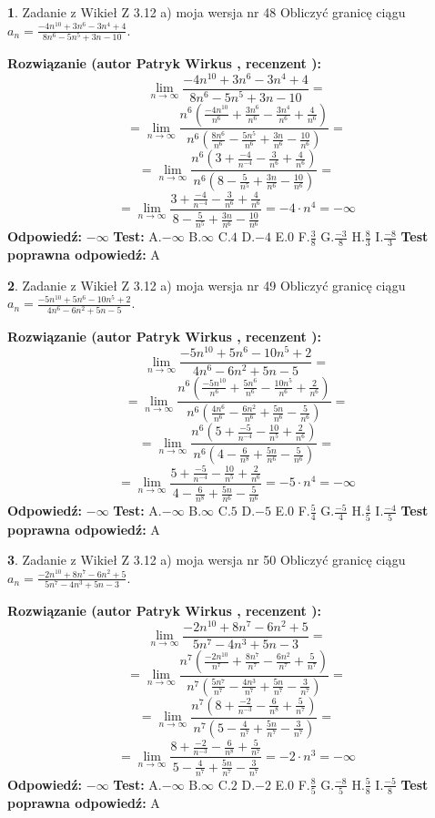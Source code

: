 \documentclass[12pt, a4paper]{article}
\theoremstyle{definition} %
\newtheorem{zad}{}
\newcommand{\zadStart}[1]{\begin{zad}#1\newline}
\newcommand{\zadStop}{\end{zad}}
\newcommand{\rozwStart}[2]{\noindent \textbf{Rozwiązanie (autor #1 , recenzent #2): }\newline}
\newcommand{\rozwStop}{\newline}
\newcommand{\odpStart}{\noindent \textbf{Odpowiedź:}\newline}
\newcommand{\odpStop}{\newline}
\newcommand{\testStart}{\noindent \textbf{Test:}\newline}
\newcommand{\testStop}{\newline}
\newcommand{\kluczStart}{\noindent \textbf{Test poprawna odpowiedź:}\newline}
\newcommand{\kluczStop}{\newline}
\begin{document}
\zadStart{Zadanie z Wikieł Z 3.12 a) moja wersja nr 48}
Obliczyć granicę ciągu $a_{n}=\frac{-4n^{10}+3n^{6}-3n^{4}+4}{8n^{6}-5n^{5}+3n-10}$.
\zadStop
\rozwStart{Patryk Wirkus}{}
$$\lim\limits_{n\to\infty}\frac{-4n^{10}+3n^{6}-3n^{4}+4}{8n^{6}-5n^{5}+3n-10}=$$
$$=\lim\limits_{n\to\infty}\frac{n^{6}\left(\frac{-4n^{10}}{n^{6}}+\frac{3n^{6}}{n^{6}}-\frac{3n^{4}}{n^{6}}+\frac{4}{n^{6}}\right)}{n^{6}\left(\frac{8n^{6}}{n^{6}}-\frac{5n^{5}}{n^{6}}+\frac{3n}{n^{6}}-\frac{10}{n^{6}}\right)}=$$
$$=\lim\limits_{n\to\infty}\frac{n^{6}\left(3+\frac{-4}{n^{-4}}-\frac{3}{n^{6}}+\frac{4}{n^{6}}\right)}
{n^{6}\left(8-\frac{5}{n^{5}}+\frac{3n}{n^{6}}-\frac{10}{n^{6}}\right)}=$$
$$=\lim\limits_{n\to\infty}\frac{3+\frac{-4}{n^{-4}}-\frac{3}{n^{6}}+\frac{4}{n^{6}}}{8-\frac{5}{n^{5}}+\frac{3n}{n^{6}}-\frac{10}{n^{6}}}=-4\cdot n^{4} = -\infty$$
\rozwStop
\odpStart
$-\infty$
\odpStop
\testStart
A.$-\infty$
B.$\infty$
C.$4$
D.$-4$
E.$0$
F.$\frac{3}{8}$
G.$\frac{-3}{8}$
H.$\frac{8}{3}$
I.$\frac{-8}{3}$
\testStop
\kluczStart
A
\kluczStop



\zadStart{Zadanie z Wikieł Z 3.12 a) moja wersja nr 49}
Obliczyć granicę ciągu $a_{n}=\frac{-5n^{10}+5n^{6}-10n^{5}+2}{4n^{6}-6n^{2}+5n-5}$.
\zadStop
\rozwStart{Patryk Wirkus}{}
$$\lim\limits_{n\to\infty}\frac{-5n^{10}+5n^{6}-10n^{5}+2}{4n^{6}-6n^{2}+5n-5}=$$
$$=\lim\limits_{n\to\infty}\frac{n^{6}\left(\frac{-5n^{10}}{n^{6}}+\frac{5n^{6}}{n^{6}}-\frac{10n^{5}}{n^{6}}+\frac{2}{n^{6}}\right)}{n^{6}\left(\frac{4n^{6}}{n^{6}}-\frac{6n^{2}}{n^{6}}+\frac{5n}{n^{6}}-\frac{5}{n^{6}}\right)}=$$
$$=\lim\limits_{n\to\infty}\frac{n^{6}\left(5+\frac{-5}{n^{-4}}-\frac{10}{n^{5}}+\frac{2}{n^{6}}\right)}
{n^{6}\left(4-\frac{6}{n^{8}}+\frac{5n}{n^{6}}-\frac{5}{n^{6}}\right)}=$$
$$=\lim\limits_{n\to\infty}\frac{5+\frac{-5}{n^{-4}}-\frac{10}{n^{5}}+\frac{2}{n^{6}}}{4-\frac{6}{n^{8}}+\frac{5n}{n^{6}}-\frac{5}{n^{6}}}=-5\cdot n^{4} = -\infty$$
\rozwStop
\odpStart
$-\infty$
\odpStop
\testStart
A.$-\infty$
B.$\infty$
C.$5$
D.$-5$
E.$0$
F.$\frac{5}{4}$
G.$\frac{-5}{4}$
H.$\frac{4}{5}$
I.$\frac{-4}{5}$
\testStop
\kluczStart
A
\kluczStop



\zadStart{Zadanie z Wikieł Z 3.12 a) moja wersja nr 50}
Obliczyć granicę ciągu $a_{n}=\frac{-2n^{10}+8n^{7}-6n^{2}+5}{5n^{7}-4n^{3}+5n-3}$.
\zadStop
\rozwStart{Patryk Wirkus}{}
$$\lim\limits_{n\to\infty}\frac{-2n^{10}+8n^{7}-6n^{2}+5}{5n^{7}-4n^{3}+5n-3}=$$
$$=\lim\limits_{n\to\infty}\frac{n^{7}\left(\frac{-2n^{10}}{n^{7}}+\frac{8n^{7}}{n^{7}}-\frac{6n^{2}}{n^{7}}+\frac{5}{n^{7}}\right)}{n^{7}\left(\frac{5n^{7}}{n^{7}}-\frac{4n^{3}}{n^{7}}+\frac{5n}{n^{7}}-\frac{3}{n^{7}}\right)}=$$
$$=\lim\limits_{n\to\infty}\frac{n^{7}\left(8+\frac{-2}{n^{-3}}-\frac{6}{n^{8}}+\frac{5}{n^{7}}\right)}
{n^{7}\left(5-\frac{4}{n^{7}}+\frac{5n}{n^{7}}-\frac{3}{n^{7}}\right)}=$$
$$=\lim\limits_{n\to\infty}\frac{8+\frac{-2}{n^{-3}}-\frac{6}{n^{8}}+\frac{5}{n^{7}}}{5-\frac{4}{n^{7}}+\frac{5n}{n^{7}}-\frac{3}{n^{7}}}=-2\cdot n^{3} = -\infty$$
\rozwStop
\odpStart
$-\infty$
\odpStop
\testStart
A.$-\infty$
B.$\infty$
C.$2$
D.$-2$
E.$0$
F.$\frac{8}{5}$
G.$\frac{-8}{5}$
H.$\frac{5}{8}$
I.$\frac{-5}{8}$
\testStop
\kluczStart
A
\kluczStop
\end{document}

